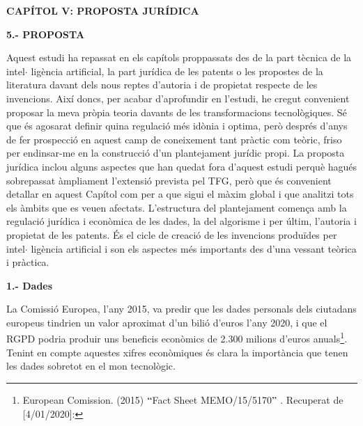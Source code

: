 \documentclass[12pt]{article}
\begin{document}
\begin{Center}
{\fontsize{16pt}{19.2pt}\selectfont \textbf{CAPÍTOL V: PROPOSTA JURÍDICA}\par}
\end{Center}\par


\vspace{\baselineskip}
\begin{justify}
\textbf{5.- PROPOSTA}
\end{justify}\par


\vspace{\baselineskip}
\begin{justify}
Aquest estudi ha repassat en els capítols proppassats des de la part tècnica de la intel$ \cdot $ ligència artificial, la part jurídica de les patents o les propostes de la literatura davant dels nous reptes d’autoria i de propietat respecte de les invencions. Així doncs, per acabar d’aprofundir en l’estudi, he cregut convenient proposar la meva pròpia teoria davants de les transformacions tecnològiques. Sé que és agosarat definir quina regulació més idònia i optima, però després d’anys de fer prospecció en aquest camp de coneixement tant pràctic com teòric, friso per endinsar-me en la construcció d’un plantejament jurídic propi. La proposta jurídica inclou alguns aspectes que han quedat fora d’aquest estudi perquè hagués sobrepassat àmpliament l’extensió prevista pel TFG, però que és convenient detallar en aquest Capítol com per a que sigui el màxim global i que analitzi tots els àmbits que es veuen afectats. L’estructura del plantejament comença amb la regulació jurídica i econòmica de les dades, la del algorisme i per últim, l’autoria i propietat de les patents. És el cicle de creació de les invencions produïdes per intel$ \cdot $ ligència artificial i son els aspectes més importants des d’una vessant teòrica i pràctica. 
\end{justify}\par


\vspace{\baselineskip}
\textbf{1.- Dades}\par


\vspace{\baselineskip}
\begin{justify}
La Comissió Europea, l’any 2015, va predir que les dades personals dels ciutadans europeus tindrien un valor aproximat d’un bilió d’euros l’any 2020, i que el RGPD podria produir uns beneficis econòmics de 2.300 milions d’euros anuals\footnote{ European Comission. (2015) $``$Fact Sheet MEMO/15/5170$"$ . Recuperat de [4/01/2020]:  }. Tenint en compte aquestes xifres econòmiques és clara la importància que tenen les dades sobretot en el mon tecnològic. 
\end{justify}\par
\end{document}
